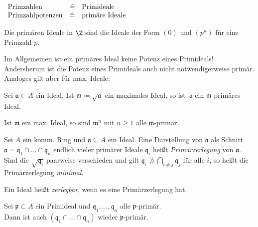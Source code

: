 \documentclass{cheat-sheet}
\newcommand{\aaa}{\mathfrak{a}}
\newcommand{\ppp}{\mathfrak{p}}
\newcommand{\qqq}{\mathfrak{q}}
\newcommand{\mmm}{\mathfrak{m}}
\begin{document}
\begin{bem}
  $\begin{array}[t]{l c l}
    \text{Primzahlen} & \hat{=} & \text{Primideale} \\
    \text{Primzahlpotenzen} & \hat{=} & \text{primäre Ideale} \\
  \end{array}$
\end{bem}

\begin{bsp}
  Die primären Ideale in $\Z$ sind die Ideale der Form $(0)$ und $(p^n)$ für eine Primzahl $p$.
\end{bsp}

\begin{acht}
  Im Allgemeinen ist ein primäres Ideal keine Potenz eines Primideals!
  Andersherum ist die Potenz eines Primideals auch nicht notwendigerweise primär.
  Analoges gilt aber für max. Ideale:
\end{acht}

\begin{prop}
  Sei $\aaa \subset A$ ein Ideal.
  Ist $\mmm \coloneqq \sqrt{\aaa}$ ein maximales Ideal, so ist~$\aaa$ ein $\mmm$-primäres Ideal.
\end{prop}

\begin{kor}
  Ist $\mmm$ ein max. Ideal, so sind $\mmm^n$ mit $n \geq 1$ alle $\mmm$-primär.
\end{kor}

\begin{defn}
  Sei $A$ ein komm. Ring und $\aaa \subseteq A$ ein Ideal.
  Eine Darstellung von $\aaa$ als Schnitt $\aaa = \qqq_1 \cap \ldots \cap \qqq_n$ endlich vieler primärer Ideale $\qqq_i$ heißt \emph{Primärzerlegung} von $\aaa$.
  Sind die $\sqrt{\qqq_i}$ paarweise verschieden und gilt $\qqq_i \not\supset \bigcap_{i \neq j} \qqq_j$ für alle $i$, so heißt die Primärzerlegung \emph{minimal}.
\end{defn}

\begin{defn}
  Ein Ideal heißt \emph{zerlegbar}, wenn es eine Primärzerlegung hat.
\end{defn}


\begin{lem}
  Sei $\ppp \subset A$ ein Primideal und $\qqq_1, \ldots, \qqq_n$ alle $\ppp$-primär. \\
  Dann ist auch $(\qqq_1 \cap \ldots \cap \qqq_n)$ wieder $\ppp$-primär.
\end{lem}
\end{document}
